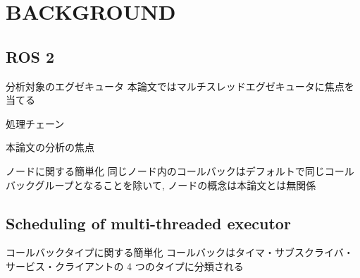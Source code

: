 

\section{BACKGROUND}
\label{sec: background}


\subsection{ROS 2}
\label{ssec: ros2}

\begin{frame}{分析対象のエグゼキュータ}
    本論文ではマルチスレッドエグゼキュータに焦点を当てる
\end{frame}

\begin{frame}{処理チェーン}
\end{frame}

\begin{frame}{本論文の分析の焦点}
\end{frame}

\begin{frame}{ノードに関する簡単化}
    同じノード内のコールバックはデフォルトで同じコールバックグループとなることを除いて, ノードの概念は本論文とは無関係

\end{frame}


\subsection{Scheduling of multi-threaded executor}
\label{ssec: scheduling_of_multi_threaded_executor}

\begin{frame}{コールバックタイプに関する簡単化}
    コールバックはタイマ・サブスクライバ・サービス・クライアントの 4 つのタイプに分類される
\end{frame}

